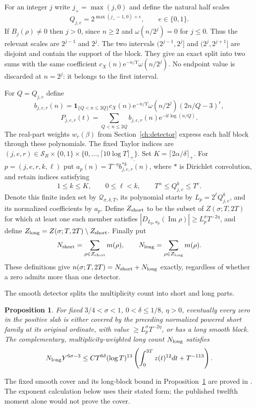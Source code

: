 \documentclass[11pt,a4paper,oneside]{article}
\newtheorem{proposition}[theorem]{Proposition}
\theoremstyle{definition}
\newcommand{\ii}{\mathrm i}
\newcommand{\e}{\mathrm e}
\newcommand{\one}{\mathbf 1}
\newcommand{\Ima}{\operatorname{Im}}
\numberwithin{equation}{section}
\begin{document}
For an integer $j$ write $j_+=\max(j,0)$ and define the natural half scales
\[
 Q_{j,e}=2^{\max(j_+-1,0)+e},\qquad e\in\{0,1\}.
\]
If $B_j(\rho)\ne0$ then $j>0$, since $n\ge2$ and $\omega(n/2^j)=0$ for $j\le0$. Thus the relevant scales are $2^{j-1}$ and $2^j$. The two intervals $(2^{j-1},2^j]$ and $(2^j,2^{j+1}]$ are disjoint and contain the support of the block. They give an exact split into two sums with the same coefficient $c_X(n)\e^{-n/Y}\omega(n/2^j)$. No endpoint value is discarded at $n=2^j$: it belongs to the first interval.

For $Q=Q_{j,e}$ define
\[
 b_{j,e,r}(n)=\one_{\{Q<n\le2Q\}}c_X(n)\e^{-n/Y}\omega(n/2^j)(2n/Q-3)^r,
\]\[
 P_{j,e,r}(t)=\sum_{Q<n\le2Q}b_{j,e,r}(n)\e^{-\ii t\log(n/Q)}.
\]
The real-part weights $w_r(\beta)$ from Section~\ref{ch:detector} express each half block through these polynomials. The fixed Taylor indices are $(j,e,r)\in\mathcal S_R\times\{0,1\}\times\{0,\ldots,\lceil10\log T\rceil_+\}$. Set $K=\lceil2\alpha/\delta\rceil_+$. For $p=(j,e,r,k,\ell)$ put $a_p(n)=T^{-\eta}\overline{b_{j,e,r}^{*k}(n)}$, where $*$ is Dirichlet convolution, and retain indices satisfying
\[
 1\le k\le K,\qquad0\le\ell<k,\qquad T^\alpha\le Q_{j,e}^k\le T^c.
\]
Denote this finite index set by $\mathcal Q_{\sigma,\delta,T}$, its polynomial starts by $L_p=2^\ell Q_{j,e}^k$, and its normalized coefficients by $a_p$. Define $Z_{\rm short}$ to be the subset of $Z(\sigma;T,2T)$ for which at least one such member satisfies $|D_{L_p,a_p}(\Ima\rho)|\ge L_p^\sigma T^{-2\eta}$, and define $Z_{\rm long}=Z(\sigma;T,2T)\setminus Z_{\rm short}$. Finally put
\[
 N_{\rm short}=\sum_{\rho\in Z_{\rm short}}m(\rho),\qquad
 N_{\rm long}=\sum_{\rho\in Z_{\rm long}}m(\rho).
\]
These definitions give $n(\sigma;T,2T)=N_{\rm short}+N_{\rm long}$ exactly, regardless of whether a zero admits more than one detector.

The smooth detector splits the multiplicity count into short and long parts.
\begin{proposition}\label{input:smoothcover}
For fixed $3/4<\sigma<1$, $0<\delta\le1/8$, $\eta>0$, eventually every
zero in the positive slab is either covered by the preceding
normalized powered short family at its original ordinate, with value
$\ge L_p^\sigma T^{-2\eta}$, or has a long smooth block.
The complementary, multiplicity-weighted long count $N_{\rm long}$ satisfies
\begin{equation}\label{eq:longraw}
 N_{\rm long}Y^{6\sigma-3}
 \le CT^{6\delta}(\log T)^{13}
          \left(\int_0^{3T}z(t)^{12}dt+T^{-113}\right).
\end{equation}
\end{proposition}
The fixed smooth cover and its long-block bound in Proposition~\ref{input:smoothcover} are proved in \cite{Lewko}. The exponent calculation below uses their stated form; the published twelfth moment alone would not prove the cover.
\end{document}
